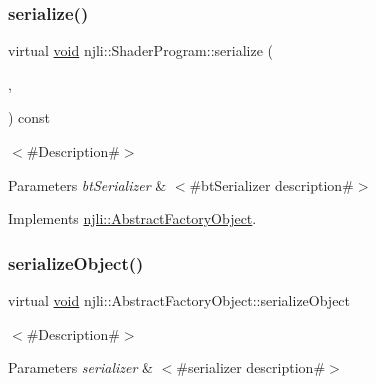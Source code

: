 \mbox{\label{classnjli_1_1_shader_program_afe83d2e58961011b642a25e7c15a6953}} 
\subsubsection{\texorpdfstring{serialize()}{serialize()}}
{\footnotesize\ttfamily virtual \mbox{\hyperlink{_thread_8h_af1e856da2e658414cb2456cb6f7ebc66}{void}} njli\+::\+Shader\+Program\+::serialize (\begin{DoxyParamCaption}\item[{\mbox{\hyperlink{_thread_8h_af1e856da2e658414cb2456cb6f7ebc66}{void}} $\ast$}]{,  }\item[{bt\+Serializer $\ast$}]{ }\end{DoxyParamCaption}) const\hspace{0.3cm}{\ttfamily [virtual]}}

$<$\#\+Description\#$>$


\begin{DoxyParams}{Parameters}
{\em bt\+Serializer} & $<$\#bt\+Serializer description\#$>$ \\
\hline
\end{DoxyParams}


Implements \mbox{\hyperlink{classnjli_1_1_abstract_factory_object_aad2fbe86fb3bdecf02918a96b9c57976}{njli\+::\+Abstract\+Factory\+Object}}.

\mbox{\label{classnjli_1_1_shader_program_a4fc4bcd9d1930911474210c047372fc0}} 
\subsubsection{\texorpdfstring{serialize\+Object()}{serializeObject()}}
{\footnotesize\ttfamily virtual \mbox{\hyperlink{_thread_8h_af1e856da2e658414cb2456cb6f7ebc66}{void}} njli\+::\+Abstract\+Factory\+Object\+::serialize\+Object}

$<$\#\+Description\#$>$


\begin{DoxyParams}{Parameters}
{\em serializer} & $<$\#serializer description\#$>$ \\
\hline
\end{DoxyParams}
\mbox{\label{classnjli_1_1_shader_program_a087eb5f8d9f51cc476f12f1d10a3cb95}} 
